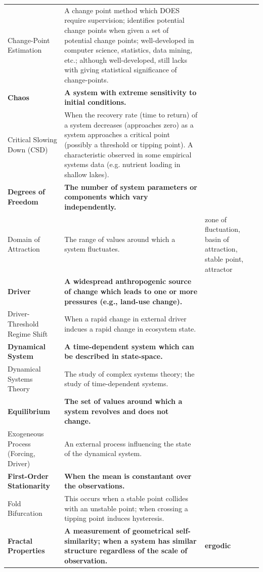 \documentclass[12pt,twoside,openany]{reedthesis}
\begin{document}
\begin{longtable}{>{\raggedright\arraybackslash}p{8em}>{\raggedright\arraybackslash}p{25em}>{\raggedright\arraybackslash}p{6em}}
Change-Point Estimation & A change point method which DOES require supervision; identifies potential change points when given a set of potential change points; well-developed in computer science, statistics, data mining, etc.; although well-developed, still lacks with giving statistical significance of change-points. & \\
\textbf{Chaos} & \textbf{A system with extreme sensitivity to initial conditions.} & \textbf{}\\
\addlinespace
Critical Slowing Down (CSD) & When the recovery rate (time to return) of a system decreases (approaches zero) as a system approaches a critical point (possibly a threshold or tipping point). A characteristic observed in some empirical systems data (e.g. nutrient loading in shallow lakes). & \\
\textbf{Degrees of Freedom} & \textbf{The number of system parameters or components which vary independently.} & \textbf{}\\
Domain of Attraction & The range of values around which a system fluctuates. & zone of fluctuation, basin of attraction, stable point, attractor\\
\textbf{Driver} & \textbf{A widespread anthropogenic source of change which leads to one or more pressures (e.g., land-use change).} & \textbf{}\\
Driver-Threshold Regime Shift & When a rapid change in external driver indcues a rapid change in ecosystem state. & \\
\addlinespace
\textbf{Dynamical System} & \textbf{A time-dependent system which can be described in state-space.} & \textbf{}\\
Dynamical Systems Theory & The study of complex systems theory; the study of time-dependent systems. & \\
\textbf{Equilibrium} & \textbf{The set of values around which a system revolves and does not change.} & \textbf{}\\
Exogeneous Process (Forcing, Driver) & An external process influencing the state of the dynamical system. & \\
\textbf{First-Order Stationarity} & \textbf{When the mean is constantant over the observations.} & \textbf{}\\
\addlinespace
Fold Bifurcation & This occurs when a stable point collides with an unstable point; when crossing a tipping point induces hysteresis. & \\
\textbf{Fractal Properties} & \textbf{A measurement of geometrical self-similarity; when a system has similar structure regardless of the scale of observation.} & \textbf{ergodic}\\

\end{longtable}
\end{document}
